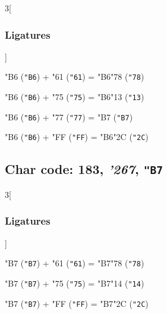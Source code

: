 \documentclass{article}
\newlength{\maxcharwidth}
\begin{document}

\begin{multicols}{3}[\subsubsection{Ligatures}]

{\testfont\char"B6\noboundary} ({\tt"B6}) + {\testfont\char"61\noboundary} ({\tt"61}) = {\testfont\char"B6\noboundary}{\testfont\char"78\noboundary} ({\tt"78}) 

{\testfont\char"B6\noboundary} ({\tt"B6}) + {\testfont\char"75\noboundary} ({\tt"75}) = {\testfont\char"B6\noboundary}{\testfont\char"13\noboundary} ({\tt"13}) 

{\testfont\char"B6\noboundary} ({\tt"B6}) + {\testfont\char"77\noboundary} ({\tt"77}) = {\testfont\char"B7\noboundary} ({\tt"B7}) 

{\testfont\char"B6\noboundary} ({\tt"B6}) + {\testfont\char"FF\noboundary} ({\tt"FF}) = {\testfont\char"B6\noboundary}{\testfont\char"2C\noboundary} ({\tt"2C}) 

\end{multicols}

\subsection{Char code: 183, {\it'267}, {\tt"B7}}
\label{char_183}


\begin{multicols}{3}[\subsubsection{Ligatures}]

{\testfont\char"B7\noboundary} ({\tt"B7}) + {\testfont\char"61\noboundary} ({\tt"61}) = {\testfont\char"B7\noboundary}{\testfont\char"78\noboundary} ({\tt"78}) 

{\testfont\char"B7\noboundary} ({\tt"B7}) + {\testfont\char"75\noboundary} ({\tt"75}) = {\testfont\char"B7\noboundary}{\testfont\char"14\noboundary} ({\tt"14}) 

{\testfont\char"B7\noboundary} ({\tt"B7}) + {\testfont\char"FF\noboundary} ({\tt"FF}) = {\testfont\char"B7\noboundary}{\testfont\char"2C\noboundary} ({\tt"2C}) 

\end{multicols}
\end{document}
